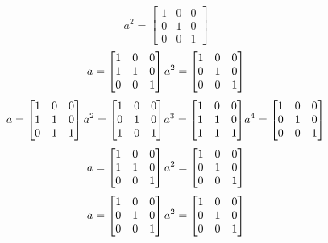 \begin{mdframed}[style=darkAnswer,frametitle={Joe Starr}]
\begin{itemize}
{$$    a^{ 2 }={ \begin{bmatrix}1&0&0\\0&1&0\\0&0&1\end{bmatrix} }
    $$
    $$a= \begin{bmatrix}1&0&0\\1&1&0\\0&0&1\end{bmatrix} \\
    a^{ 2 }={ \begin{bmatrix}1&0&0\\0&1&0\\0&0&1\end{bmatrix} }
    $$
    $$a= \begin{bmatrix}1&0&0\\1&1&0\\0&1&1\end{bmatrix} \\
    a^{ 2 }={ \begin{bmatrix}1&0&0\\0&1&0\\1&0&1\end{bmatrix} }
    a^{ 3 }={ \begin{bmatrix}1&0&0\\1&1&0\\1&1&1\end{bmatrix} }
    a^{ 4 }={ \begin{bmatrix}1&0&0\\0&1&0\\0&0&1\end{bmatrix} }
    $$
    $$a= \begin{bmatrix}1&0&0\\1&1&0\\0&0&1\end{bmatrix} \\
    a^{ 2 }={ \begin{bmatrix}1&0&0\\0&1&0\\0&0&1\end{bmatrix} }
    $$
    $$a= \begin{bmatrix}1&0&0\\0&1&0\\0&0&1\end{bmatrix} \\
    a^{ 2 }={ \begin{bmatrix}1&0&0\\0&1&0\\0&0&1\end{bmatrix} }
$$}
\end{itemize}
\end{mdframed}
